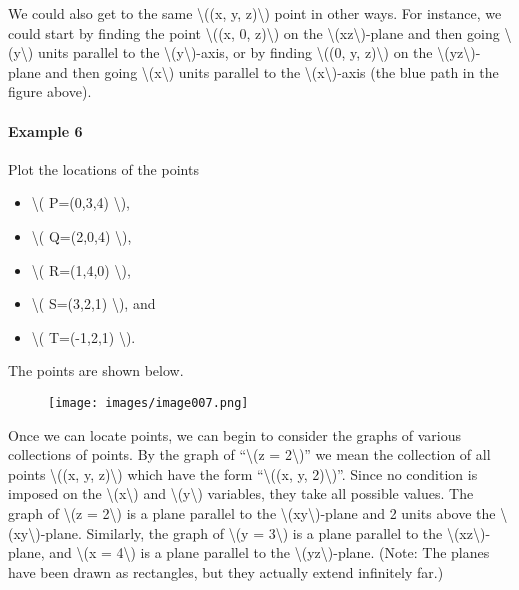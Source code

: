 We could also get to the same \textbackslash{}((x, y,
z)\textbackslash{}) point in other ways. For instance, we could start by
finding the point \textbackslash{}((x, 0, z)\textbackslash{}) on the
\textbackslash{}(xz\textbackslash{})-plane and then going
\textbackslash{}(y\textbackslash{}) units parallel to the
\textbackslash{}(y\textbackslash{})-axis, or by finding
\textbackslash{}((0, y, z)\textbackslash{}) on the
\textbackslash{}(yz\textbackslash{})-plane and then going
\textbackslash{}(x\textbackslash{}) units parallel to the
\textbackslash{}(x\textbackslash{})-axis (the blue path in the figure
above).

\hypertarget{example-6}{%
\paragraph{Example 6}\label{example-6}}

Plot the locations of the points

\begin{itemize}
\tightlist
\item
  \textbackslash{}( P=(0,3,4) \textbackslash{}),
\item
  \textbackslash{}( Q=(2,0,4) \textbackslash{}),
\item
  \textbackslash{}( R=(1,4,0) \textbackslash{}),
\item
  \textbackslash{}( S=(3,2,1) \textbackslash{}), and
\item
  \textbackslash{}( T=(-1,2,1) \textbackslash{}).
\end{itemize}

The points are shown below.

\begin{figure}
\centering
\texttt{[image: images/image007.png]}
\caption{}
\end{figure}

Once we can locate points, we can begin to consider the graphs of
various collections of points. By the graph of ``\textbackslash{}(z =
2\textbackslash{})'' we mean the collection of all points
\textbackslash{}((x, y, z)\textbackslash{}) which have the form
``\textbackslash{}((x, y, 2)\textbackslash{})''. Since no condition is
imposed on the \textbackslash{}(x\textbackslash{}) and
\textbackslash{}(y\textbackslash{}) variables, they take all possible
values. The graph of \textbackslash{}(z = 2\textbackslash{}) is a plane
parallel to the \textbackslash{}(xy\textbackslash{})-plane and 2 units
above the \textbackslash{}(xy\textbackslash{})-plane. Similarly, the
graph of \textbackslash{}(y = 3\textbackslash{}) is a plane parallel to
the \textbackslash{}(xz\textbackslash{})-plane, and \textbackslash{}(x =
4\textbackslash{}) is a plane parallel to the
\textbackslash{}(yz\textbackslash{})-plane. (Note: The planes have been
drawn as rectangles, but they actually extend infinitely far.)

